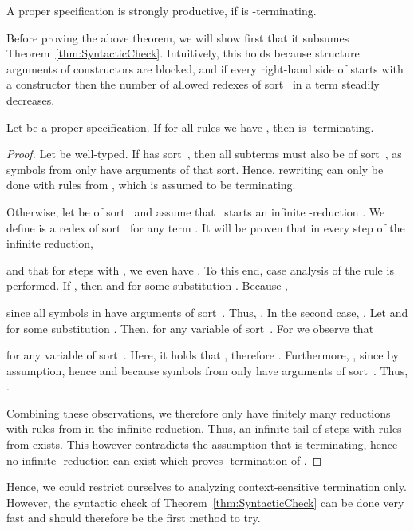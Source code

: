 \documentclass{eptcs}
\begin{document}
\begin{theorem}
\label{thm:CStermination}
A proper specification  is
strongly productive, if  is -terminating.
\end{theorem}

Before proving the above theorem, we will show first that it subsumes
Theorem~\ref{thm:SyntacticCheck}. Intuitively, this holds because structure
arguments of constructors are blocked, and if every right-hand side of 
starts with a constructor then the number of allowed redexes of sort~ in a
term steadily decreases.

\begin{proposition}
\label{prop:CSimpliesSyn}
Let  be a proper specification.
If for all rules  we have , then
 is -terminating.
\end{proposition}

\begin{proof}
Let  be well-typed.
If  has sort~, then all subterms must also be of sort~, as symbols from
 only have arguments of that sort. Hence, rewriting can only be done
with rules from , which is assumed to be terminating.

Otherwise, let  be of sort~ and assume that~ starts an infinite
-reduction
.
We define
 is a redex of sort~
for any term .
It will be proven that in every step 
of the infinite reduction,

and that for steps with , we even have
.
To this end, case analysis of the rule  is performed.
If , then  and
 for some substitution .
Because ,

since all symbols in  have arguments of sort~.
Thus, .
In the second case, . Let
 and
 for some substitution .
Then, 
for any variable  of sort~.
For  we observe that

for any variable  of sort~.
Here, it holds that
,
therefore .
Furthermore, ,
since  by assumption, hence
 and because symbols from
 only have arguments of sort~.
Thus, .

Combining these observations, we therefore only have finitely many reductions
with rules from  in the infinite reduction. Thus, an infinite tail of
steps with rules from  exists. This however contradicts the assumption
that  is terminating, hence no infinite -reduction can exist which
proves -termination of .
\end{proof}

Hence, we could restrict ourselves to analyzing context-sensitive termination
only. However, the syntactic check of Theorem~\ref{thm:SyntacticCheck} can be
done very fast and should therefore be the first method to try.
\end{document}
